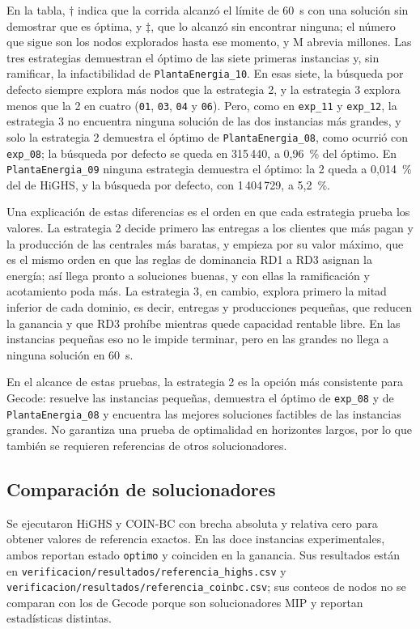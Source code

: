 En la tabla, $\dagger$ indica que la corrida alcanzó el límite de 60~s con una solución sin demostrar que es óptima, y $\ddagger$, que lo alcanzó sin encontrar ninguna; el número que sigue son los nodos explorados hasta ese momento, y M abrevia millones. Las tres estrategias demuestran el óptimo de las siete primeras instancias y, sin ramificar, la infactibilidad de \texttt{PlantaEnergia\_10}. En esas siete, la búsqueda por defecto siempre explora más nodos que la estrategia 2, y la estrategia 3 explora menos que la 2 en cuatro (\texttt{01}, \texttt{03}, \texttt{04} y \texttt{06}). Pero, como en \texttt{exp\_11} y \texttt{exp\_12}, la estrategia 3 no encuentra ninguna solución de las dos instancias más grandes, y solo la estrategia 2 demuestra el óptimo de \texttt{PlantaEnergia\_08}, como ocurrió con \texttt{exp\_08}; la búsqueda por defecto se queda en 315\,440, a 0,96~\% del óptimo. En \texttt{PlantaEnergia\_09} ninguna estrategia demuestra el óptimo: la 2 queda a 0,014~\% del de HiGHS, y la búsqueda por defecto, con 1\,404\,729, a 5,2~\%.

Una explicación de estas diferencias es el orden en que cada estrategia prueba los valores. La estrategia 2 decide primero las entregas a los clientes que más pagan y la producción de las centrales más baratas, y empieza por su valor máximo, que es el mismo orden en que las reglas de dominancia RD1 a RD3 asignan la energía; así llega pronto a soluciones buenas, y con ellas la ramificación y acotamiento poda más. La estrategia 3, en cambio, explora primero la mitad inferior de cada dominio, es decir, entregas y producciones pequeñas, que reducen la ganancia y que RD3 prohíbe mientras quede capacidad rentable libre. En las instancias pequeñas eso no le impide terminar, pero en las grandes no llega a ninguna solución en 60~s.

En el alcance de estas pruebas, la estrategia 2 es la opción más consistente para Gecode: resuelve las instancias pequeñas, demuestra el óptimo de \texttt{exp\_08} y de \texttt{PlantaEnergia\_08} y encuentra las mejores soluciones factibles de las instancias grandes. No garantiza una prueba de optimalidad en horizontes largos, por lo que también se requieren referencias de otros solucionadores.

\subsection{Comparación de solucionadores}

Se ejecutaron HiGHS y COIN-BC con brecha absoluta y relativa cero para obtener valores de referencia exactos. En las doce instancias experimentales, ambos reportan estado \texttt{optimo} y coinciden en la ganancia. Sus resultados están en \texttt{verificacion/resultados/referencia\_highs.csv} y \texttt{verificacion/resultados/referencia\_coinbc.csv}; sus conteos de nodos no se comparan con los de Gecode porque son solucionadores MIP y reportan estadísticas distintas.

